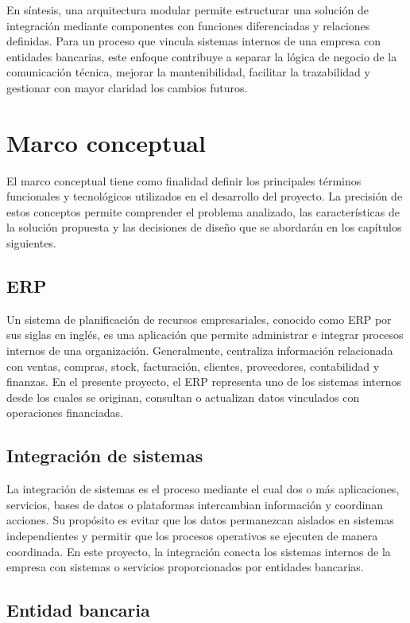 En síntesis, una arquitectura modular permite estructurar una solución de integración mediante componentes con funciones diferenciadas y relaciones definidas. Para un proceso que vincula sistemas internos de una empresa con entidades bancarias, este enfoque contribuye a separar la lógica de negocio de la comunicación técnica, mejorar la mantenibilidad, facilitar la trazabilidad y gestionar con mayor claridad los cambios futuros.

\section{Marco conceptual}

El marco conceptual tiene como finalidad definir los principales términos funcionales y tecnológicos utilizados en el desarrollo del proyecto. La precisión de estos conceptos permite comprender el problema analizado, las características de la solución propuesta y las decisiones de diseño que se abordarán en los capítulos siguientes.

\subsection{ERP}

Un sistema de planificación de recursos empresariales, conocido como ERP por sus siglas en inglés, es una aplicación que permite administrar e integrar procesos internos de una organización. Generalmente, centraliza información relacionada con ventas, compras, stock, facturación, clientes, proveedores, contabilidad y finanzas. En el presente proyecto, el ERP representa uno de los sistemas internos desde los cuales se originan, consultan o actualizan datos vinculados con operaciones financiadas.

\subsection{Integración de sistemas}

La integración de sistemas es el proceso mediante el cual dos o más aplicaciones, servicios, bases de datos o plataformas intercambian información y coordinan acciones. Su propósito es evitar que los datos permanezcan aislados en sistemas independientes y permitir que los procesos operativos se ejecuten de manera coordinada. En este proyecto, la integración conecta los sistemas internos de la empresa con sistemas o servicios proporcionados por entidades bancarias.

\subsection{Entidad bancaria}

